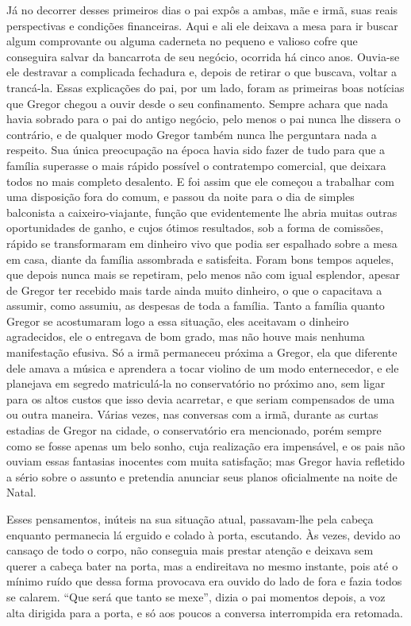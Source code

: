 Já no decorrer desses primeiros dias o pai expôs a ambas, mãe e irmã, suas
reais perspectivas e condições financeiras. Aqui e ali ele deixava a mesa
para ir buscar algum comprovante ou alguma caderneta no pequeno e valioso
cofre que conseguira salvar da bancarrota de seu negócio, ocorrida há
cinco anos. Ouvia-se ele destravar a complicada fechadura e, depois de
retirar o que buscava, voltar a trancá-la. Essas explicações do pai, por
um lado, foram as primeiras boas notícias que Gregor chegou a ouvir desde
o seu confinamento. Sempre achara que nada havia sobrado para o pai do
antigo negócio, pelo menos o pai nunca lhe dissera o contrário, e de
qualquer modo Gregor também nunca lhe perguntara nada a respeito. Sua
única preocupação na época havia sido fazer de tudo para que a família
superasse o mais rápido possível o contratempo comercial, que deixara
todos no mais completo desalento. E foi assim que ele começou a trabalhar
com uma disposição fora do comum, e passou da noite para o dia de simples
balconista a caixeiro-viajante, função que evidentemente lhe abria muitas
outras oportunidades de ganho, e cujos ótimos resultados, sob a forma de
comissões, rápido se transformaram em dinheiro vivo que podia ser
espalhado sobre a mesa em casa, diante da família assombrada e satisfeita.
Foram bons tempos aqueles, que depois nunca mais se repetiram, pelo menos
não com igual esplendor, apesar de Gregor ter recebido mais tarde ainda
muito dinheiro, o que o capacitava a assumir, como assumiu, as despesas de
toda a família. Tanto a família quanto Gregor se acostumaram logo a essa
situação, eles aceitavam o dinheiro agradecidos, ele o entregava de bom
grado, mas não houve mais nenhuma manifestação efusiva. Só a irmã
permaneceu próxima a Gregor, ela que diferente dele amava a música e
aprendera a tocar violino de um modo enternecedor, e ele planejava em
segredo matriculá-la no conservatório no próximo ano, sem ligar para os
altos custos que isso devia acarretar, e que seriam compensados de uma ou
outra maneira. Várias vezes, nas conversas com a irmã, durante as curtas
estadias de Gregor na cidade, o conservatório era mencionado, porém sempre
como se fosse apenas um belo sonho, cuja realização era impensável, e os
pais não ouviam essas fantasias inocentes com muita satisfação; mas Gregor
havia refletido a sério sobre o assunto e pretendia anunciar seus planos
oficialmente na noite de Natal.

Esses pensamentos, inúteis na sua situação atual, passavam-lhe pela cabeça
enquanto permanecia lá erguido e colado à porta, escutando. Às vezes,
devido ao cansaço de todo o corpo, não conseguia mais prestar atenção e
deixava sem querer a cabeça bater na porta, mas a endireitava no mesmo
instante, pois até o mínimo ruído que dessa forma provocava era ouvido do
lado de fora e fazia todos se calarem. “Que será que tanto se mexe”, dizia
o pai momentos depois, a voz alta dirigida para a porta, e só aos poucos a
conversa interrompida era retomada.

